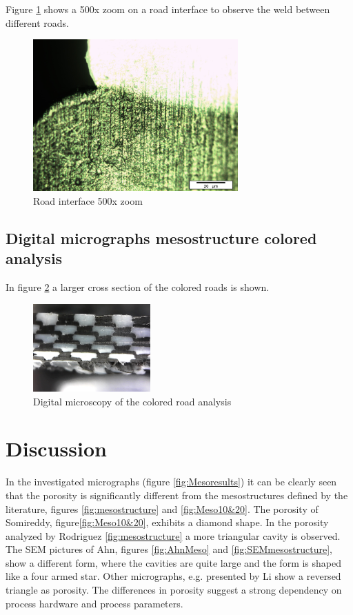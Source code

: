Figure \ref{fig:colored500x} shows a 500x zoom on a road interface to observe the weld between different roads.
\begin{figure}[H]
    \centering
    \includegraphics[width=0.70\textwidth]{chapter_4_RVE_Definition/figures/colored/Tv89_LI.jpg}
    \caption{Road interface 500x zoom}
    \label{fig:colored500x}
\end{figure}

\subsection{Digital micrographs  mesostructure colored analysis}

In figure \ref{fig:digitalcolored} a larger cross section of the colored roads is shown.
\begin{figure}[H]
    \centering
    \includegraphics[width=0.40\textwidth]{chapter_4_RVE_Definition/figures/colored/Digitalcolored.jpg}
    \caption{Digital microscopy of the colored road analysis}
    \label{fig:digitalcolored}
\end{figure}

\section{Discussion}

In the investigated micrographs (figure \ref{fig:Mesoresults}) it can be clearly seen that the porosity is significantly different from the mesostructures defined by the literature, figures \ref{fig:mesostructure} and \ref{fig:Meso10&20}. The porosity of Somireddy, figure\ref{fig:Meso10&20}, exhibits a diamond shape. In the porosity analyzed by Rodriguez \ref{fig:mesostructure} a more triangular cavity is observed. The SEM pictures of Ahn, figures \ref{fig:AhnMeso} and \ref{fig:SEMmesostructure}, show a different form, where the cavities are quite large and the form is shaped like a four armed star. Other micrographs, e.g. presented by Li \cite{Li2002CompositeProperties} show a reversed triangle as porosity. The differences in porosity suggest a strong dependency on  process hardware and process parameters.


